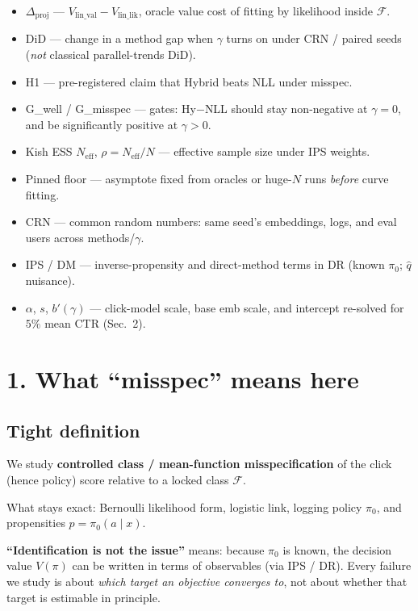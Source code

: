 \documentclass[11pt]{article}
\newcommand{\phonesection}[1]{\Needspace{8\baselineskip}\section*{#1}}
\newcommand{\phonesub}[1]{\Needspace{6\baselineskip}\subsection*{#1}}
\newcommand{\Dproj}{\Delta_{\mathrm{proj}}}
\newcommand{\Neff}{N_{\mathrm{eff}}}
\begin{document}
\begin{itemize}
        residual SD vs designed.
  \item $\Dproj$ ---
        $V_{\mathrm{lin\_val}}-V_{\mathrm{lin\_lik}}$,
        oracle value cost of fitting by
        likelihood inside $\mathcal{F}$.
  \item DiD --- change in a method gap when
        $\gamma$ turns on under CRN / paired
        seeds (\emph{not} classical
        parallel-trends DiD).
  \item H1 --- pre-registered claim that
        Hybrid beats NLL under misspec.
  \item G\_well / G\_misspec --- gates:
        Hy$-$NLL should stay non-negative at
        $\gamma{=}0$, and be significantly
        positive at $\gamma{>}0$.
  \item Kish ESS $\Neff$, $\rho=\Neff/N$ ---
        effective sample size under IPS
        weights.
  \item Pinned floor --- asymptote fixed
        from oracles or huge-$N$ runs
        \emph{before} curve fitting.
  \item CRN --- common random numbers:
        same seed's embeddings, logs, and
        eval users across methods/$\gamma$.
  \item IPS / DM --- inverse-propensity
        and direct-method terms in DR
        (known $\pi_{0}$; $\hat q$ nuisance).
  \item $\alpha$, $s$, $b'(\gamma)$ ---
        click-model scale, base emb scale,
        and intercept re-solved for $5\%$
        mean CTR (Sec.~2).
\end{itemize}

\phonesection{1. What ``misspec'' means here}

\phonesub{Tight definition}
We study \textbf{controlled class / mean-function
misspecification} of the click (hence policy)
score relative to a locked class $\mathcal{F}$.

What stays exact: Bernoulli likelihood form,
logistic link, logging policy $\pi_{0}$, and
propensities $p=\pi_{0}(a\mid x)$.

\textbf{``Identification is not the issue''}
means: because $\pi_{0}$ is known, the
decision value $V(\pi)$ can be written in
terms of observables (via IPS / DR).  Every
failure we study is about \emph{which target
an objective converges to}, not about whether
that target is estimable in principle.
\end{document}
